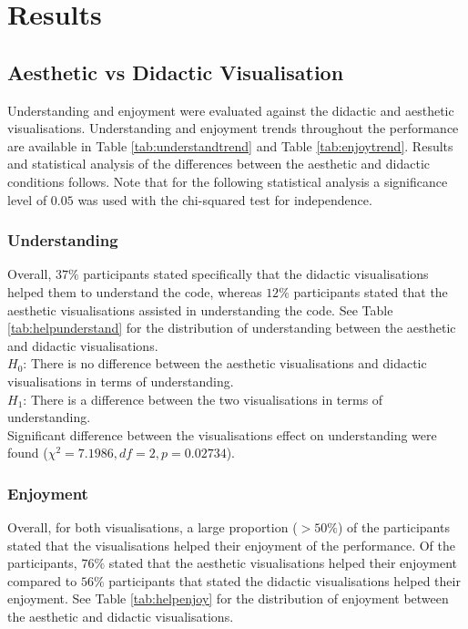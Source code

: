 \documentclass{article}
\begin{document}
\section{Results}

\subsection{Aesthetic vs Didactic Visualisation}

Understanding and enjoyment were evaluated against the didactic and aesthetic visualisations. Understanding and enjoyment trends throughout the performance are available in Table \ref{tab:understandtrend} and Table \ref{tab:enjoytrend}. Results and statistical analysis of the differences between the aesthetic and didactic conditions follows. Note that for the following statistical analysis a significance level of $0.05$ was used with the chi-squared test for independence.\\

\subsubsection{Understanding}
Overall, $37\%$ participants stated specifically that the didactic visualisations helped them to understand the code, whereas $12\%$ participants stated that the aesthetic visualisations assisted in understanding the code. See Table \ref{tab:helpunderstand} for the distribution of understanding between the aesthetic and didactic visualisations.\\

$H_0$: There is no difference between the aesthetic visualisations and didactic visualisations in terms of understanding.\\
$H_1$: There is a difference between the two visualisations in terms of understanding.\\

Significant difference between the visualisations effect on understanding were found ($\chi^2=7.1986,df=2,p=0.02734$).

\subsubsection{Enjoyment}
Overall, for both visualisations, a large proportion ($> 50\%$) of the participants stated that the visualisations helped their enjoyment of the performance. Of the participants, $76\%$ stated that the aesthetic visualisations helped their enjoyment compared to $56\%$ participants that stated the didactic visualisations helped their enjoyment. See Table \ref{tab:helpenjoy} for the distribution of enjoyment between the aesthetic and didactic visualisations.\\
\end{document}
